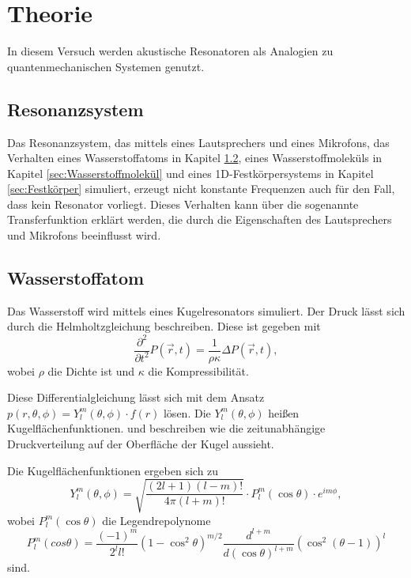 \section{Theorie}
\label{sec:Theorie}

In diesem Versuch werden akustische Resonatoren als Analogien zu quantenmechanischen Systemen genutzt. 

\subsection{Resonanzsystem}

Das Resonanzsystem, das mittels eines Lautsprechers und eines Mikrofons, das Verhalten eines Wasserstoffatoms in Kapitel \ref{sec:Wasserstoff}, eines Wasserstoffmoleküls in Kapitel \ref{sec:Wasserstoffmolekül} und eines 1D-Festkörpersystems in Kapitel \ref{sec:Festkörper} simuliert, erzeugt nicht konstante Frequenzen auch für den Fall, dass kein Resonator vorliegt.
Dieses Verhalten kann über die sogenannte Transferfunktion erklärt werden, die durch die Eigenschaften des Lautsprechers und Mikrofons beeinflusst wird. 


\subsection{Wasserstoffatom}
\label{sec:Wasserstoff}
Das Wasserstoff wird mittels eines Kugelresonators simuliert. Der Druck lässt sich durch die Helmholtzgleichung beschreiben. 
Diese ist gegeben mit 
\begin{equation*}
    \frac{\partial^2}{\partial t^2} P(\vec r,t) = \frac{1}{\rho\kappa} \Delta P(\vec r,t),
\end{equation*}
wobei $\rho$ die Dichte ist und $\kappa$ die Kompressibilität. 

Diese Differentialgleichung lässt sich mit dem Ansatz $p(r, \theta, \phi) = Y^m_l(\theta, \phi) \cdot f(r)$ lösen.
Die $Y^m_l(\theta, \phi)$ heißen Kugelflächenfunktionen. und beschreiben wie die zeitunabhängige Druckverteilung auf der Oberfläche der Kugel aussieht. 

Die Kugelflächenfunktionen ergeben sich zu 
\begin{equation*}
    Y^m_l (\theta, \phi) = \sqrt{\frac{(2l+1)(l-m)!}{4\pi(l+m)!}} \cdot P^m_l(\cos \theta) \cdot e^{i m \phi},
\end{equation*}
wobei $P^m_l(\cos \theta)$ die Legendrepolynome 
\begin{equation*}
P^m_l(cos \theta) = \frac{(-1)^m}{2^l l!} (1- \cos^2 \theta)^{m/2} \frac{d^{l+m}}{d(\cos \theta)^{l+m}} (\cos^2 (\theta -1))^l
\end{equation*}
sind.
